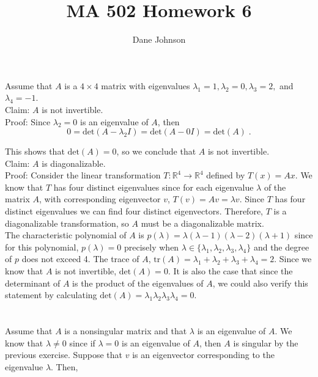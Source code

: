 \documentclass[11pt]{article}
\title{MA 502 Homework 6}
\author{Dane Johnson}
\begin{document}
\maketitle

\section{}

Assume that $A$ is a $4 \times 4$ matrix with eigenvalues $\lambda_1 = 1, \lambda_2 = 0, \lambda_3 = 2,$ and $\lambda_4 = -1$. \\

Claim: $A$ is not invertible.\\

Proof: Since $\lambda_2 = 0$ is an eigenvalue of $A$, then $$0 = \text{det}(A-\lambda_2I) = \text{det}(A-0I) = \text{det}(A) \;.$$

This shows that $\text{det}(A) = 0$, so we conclude that $A$ is not invertible.\\

Claim: $A$ is diagonalizable. \\

Proof: Consider the linear transformation $T: \mathbb{R}^4 \rightarrow \mathbb{R}^4$ defined by $T(x) = Ax$. We know that $T$ has four distinct eigenvalues since for each eigenvalue $\lambda$ of the matrix $A$, with corresponding eigenvector $v$, $T(v) = Av = \lambda v$. Since $T$ has four distinct eigenvalues we can find four distinct eigenvectors. Therefore, $T$ is a diagonalizable transformation, so $A$ must be a diagonalizable matrix. \\

The characteristic polynomial of $A$ is $p(\lambda) = \lambda(\lambda - 1)(\lambda - 2)(\lambda + 1)$ since for this polynomial, $p(\lambda) = 0$ precisely when $\lambda \in \{\lambda_1,\lambda_2,\lambda_3,\lambda_4\}$ and the degree of $p$ does not exceed 4. The trace of $A$, $\text{tr}(A) = \lambda_1 + \lambda_2 + \lambda_3 + \lambda_4 = 2$. Since we know that $A$ is not invertible, $\text{det}(A) = 0$. It is also the case that since the determinant of $A$ is the product of the eigenvalues of $A$, we could also verify this statement by calculating $\text{det}(A) = \lambda_1\lambda_2\lambda_3\lambda_4 = 0$. 

\section{}

Assume that $A$ is a nonsingular matrix and that $\lambda$ is an eigenvalue of $A$. We know that $\lambda \neq 0$ since if $\lambda = 0$ is an eigenvalue of $A$, then $A$ is singular by the previous exercise. Suppose that $v$ is an eigenvector corresponding to the eigenvalue $\lambda$. Then,
\end{document}
